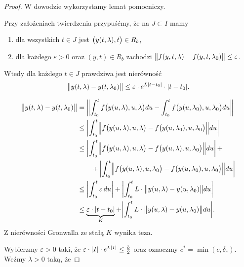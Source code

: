 \begin{proof}
  W dowodzie wykorzystamy lemat pomocniczy.
%
  \begin{nestedlemma} \label{L: Kluczowy}
%
    Przy założeniach twierdzenia przypuśćmy, że na $J \subset I$ mamy
%
    \begin{enumerate}
      \item dla wszystkich $t \in J$ jest $\p[\big]{y(t,\lambda),t} \in R_b$,
      \item dla każdego $\varepsilon > 0$ oraz $(y,t) \in R_b$ zachodzi
      $ \norm[\big]{ f(y,t,\lambda) - f(y,t,\lambda_0) } \leq \varepsilon $.
    \end{enumerate}
%
    Wtedy dla każdego $t \in J$ prawdziwa jest nierówność
%
    \begin{equation*}
      \norm[\big]{ y(t,\lambda) - y(t,\lambda_0) } \leq \varepsilon \cdot e^{L \abs{t-t_0}} \cdot \abs{t-t_0}.
    \end{equation*}
%
  \end{nestedlemma}
%
  \begin{nestedproof}
%
    \begin{align*}
      \norm[\big]{ y(t,\lambda) - y(t,\lambda_0) }
      &= \norm*{ \int_{t_0}^t f \p[\big]{ y(u, \lambda), u, \lambda } du - 
          \int_{t_0}^t f\p[\big]{ y(u,\lambda_0), u, \lambda_0 } du} \\
      &\leq \abs*{ \int_{t_0}^t \norm[\Big]{ f \p[\big]{ y(u,\lambda), u, \lambda } - 
          f\p[\big]{ y(u,\lambda_0), u, \lambda_0 } } du } \\
      &\leq \abs*{ \int_{t_0}^t \norm[\Big]{ f \p[\big]{ y(u,\lambda), u, \lambda } - 
          f\p[\big]{ y(u,\lambda), u, \lambda_0 } } du } \, + \\
      &\qquad+ \abs*{ \int_{t_0}^t \norm[\Big]{ f \p[\big]{ y(u,\lambda), u, \lambda_0 } - 
          f\p[\big]{ y(u,\lambda_0), u, \lambda_0 } } du } \\
      &\leq \abs*{\int_{t_0}^t \varepsilon \, du} + 
          \abs*{ \int_{t_0}^t L \cdot \norm[\big]{ y(u,\lambda) - y(u,\lambda_0) } du } \\
      &\leq \underbrace{\varepsilon \cdot \abs*{t-t_0}}_K + 
          \abs*{ \int_{t_0}^t L \cdot \norm[\big]{ y(u,\lambda) - y(u,\lambda_0) } du }.
    \end{align*}
%
    Z nierówności Gronwalla ze stałą $K$ wynika teza.
%
  \end{nestedproof}
%
  Wybierzmy $\varepsilon > 0$ taki, że $\varepsilon \cdot \abs{I} \cdot e^{L \abs{I}} \leq \frac b2$
  oraz oznaczmy $c^{\ast} = \min(c,\delta_{\varepsilon})$. Weźmy $\lambda > 0$ taką, że

\end{proof}

